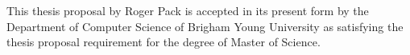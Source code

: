 \long{}

\newpage
\pagestyle{empty}
This thesis proposal by Roger Pack is accepted in its present
form by the Department of Computer Science of Brigham Young University as 
satisfying the thesis proposal requirement for the degree of
Master of Science.
\par
\vskip0.667in
\hfill\signature{Daniel Zappala, Committee Chair}
\par
\vskip0.667in
\hfill\signature{Mark Clement, Committee Member}
\par
\vskip0.667in
\hfill\signature{Christophe Giraud-Carrier, Committee Member}
\par
\vskip0.677in
\hfill\signature{Parris Egbert, Graduate Coordinator}
\par
\newpage
